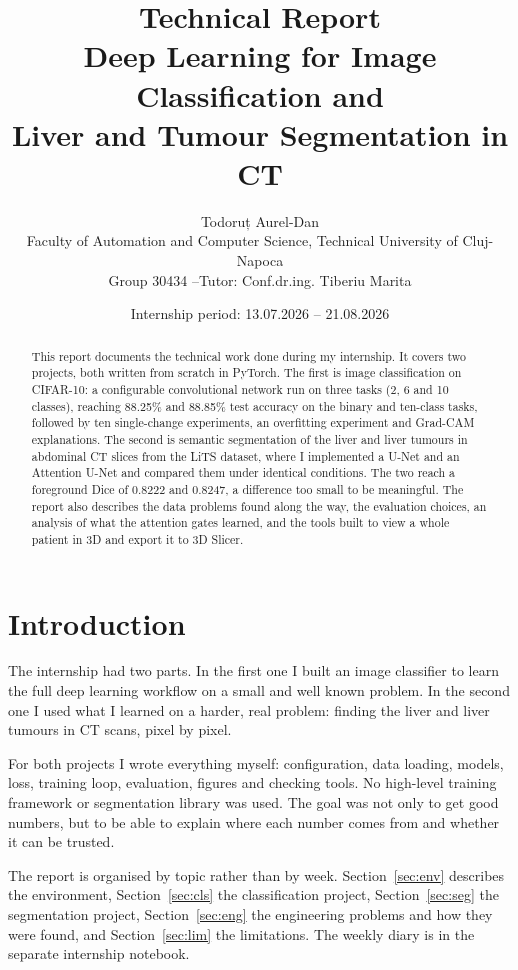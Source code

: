 \documentclass[11pt,a4paper]{article}
\title{\vspace{-1.5cm}\textbf{Technical Report}\\[0.3cm]
\large Deep Learning for Image Classification and\\Liver and Tumour Segmentation in CT}
\author{Todoruț Aurel-Dan\\[2pt]
\small Faculty of Automation and Computer Science, Technical University of Cluj-Napoca\\
\small Group 30434 \quad--\quad Tutor: Conf.dr.ing. Tiberiu Marita}
\date{Internship period: 13.07.2026 -- 21.08.2026}
\begin{document}
\maketitle
\thispagestyle{fancy}

\begin{abstract}
\noindent This report documents the technical work done during my internship. It
covers two projects, both written from scratch in PyTorch. The first is image
classification on CIFAR-10: a configurable convolutional network run on three
tasks (2, 6 and 10 classes), reaching 88.25\% and 88.85\% test accuracy on the
binary and ten-class tasks, followed by ten single-change experiments, an
overfitting experiment and Grad-CAM explanations. The second is semantic
segmentation of the liver and liver tumours in abdominal CT slices from the LiTS
dataset, where I implemented a U-Net and an Attention U-Net and compared them
under identical conditions. The two reach a foreground Dice of 0.8222 and 0.8247,
a difference too small to be meaningful. The report also describes the data
problems found along the way, the evaluation choices, an analysis of what the
attention gates learned, and the tools built to view a whole patient in 3D and
export it to 3D Slicer.
\end{abstract}

\tableofcontents
\newpage

\section{Introduction}

The internship had two parts. In the first one I built an image classifier to
learn the full deep learning workflow on a small and well known problem. In the
second one I used what I learned on a harder, real problem: finding the liver
and liver tumours in CT scans, pixel by pixel.

For both projects I wrote everything myself: configuration, data loading,
models, loss, training loop, evaluation, figures and checking tools. No
high-level training framework or segmentation library was used. The goal was not
only to get good numbers, but to be able to explain where each number comes from
and whether it can be trusted.

The report is organised by topic rather than by week. Section~\ref{sec:env}
describes the environment, Section~\ref{sec:cls} the classification project,
Section~\ref{sec:seg} the segmentation project, Section~\ref{sec:eng} the
engineering problems and how they were found, and Section~\ref{sec:lim} the
limitations. The weekly diary is in the separate internship notebook.
\end{document}
